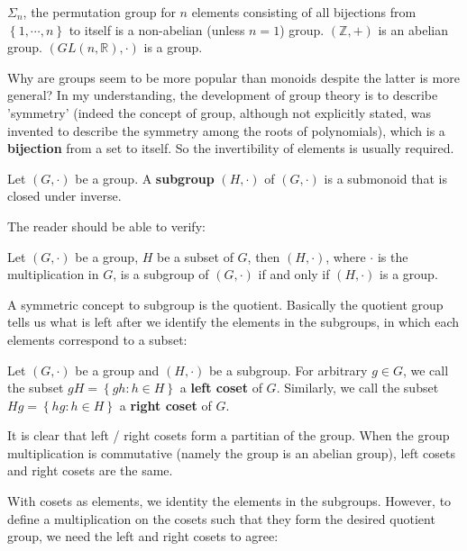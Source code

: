 \documentclass{note-eng}
\begin{document}
\begin{example}
    $\Sigma_n$, the permutation group for $n$ elements consisting of all bijections from $\left\lbrace 1, \cdots, n \right\rbrace$ to itself is a non-abelian (unless $n = 1$) group. $(\mathbb{Z}, +)$ is an abelian group. $(GL(n, \mathbb{R}), \cdot)$ is a group.
\end{example}

Why are groups seem to be more popular than monoids despite the latter is more general? In my understanding, the development of group theory is to describe 'symmetry' (indeed the concept of group, although not explicitly stated, was invented to describe the symmetry among the roots of polynomials), which is a \textbf{bijection} from a set to itself. So the invertibility of elements is usually required.

\begin{definition}[Subgroup]
    Let $(G, \cdot)$ be a group. A \textbf{subgroup} $(H, \cdot)$ of $(G, \cdot)$ is a submonoid that is closed under inverse.
\end{definition}

The reader should be able to verify:

\begin{proposition}
    Let $(G, \cdot)$ be a group, $H$ be a subset of $G$, then $(H, \cdot)$, where $\cdot$ is the multiplication in $G$, is a subgroup of $(G, \cdot)$ if and only if $(H, \cdot)$ is a group.
\end{proposition}

A symmetric concept to subgroup is the quotient. Basically the quotient group tells us what is left after we identify the elements in the subgroups, in which each elements correspond to a subset:

\begin{definition}
    Let $(G, \cdot)$ be a group and $(H, \cdot)$ be a subgroup. For arbitrary $g \in G$, we call the subset $gH = \left\lbrace gh: h \in H \right\rbrace$ a \textbf{left coset} of $G$. Similarly, we call the subset $Hg = \left\lbrace hg: h \in H \right\rbrace$ a \textbf{right coset} of $G$.
\end{definition}

It is clear that left / right cosets form a partitian of the group. When the group multiplication is commutative (namely the group is an abelian group), left cosets and right cosets are the same.

With cosets as elements, we identity the elements in the subgroups. However, to define a multiplication on the cosets such that they form the desired quotient group, we need the left and right cosets to agree:
\end{document}
